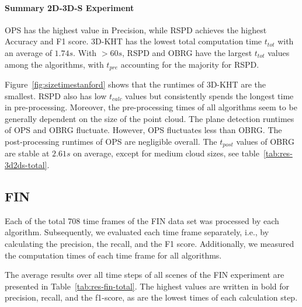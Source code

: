 \documentclass[main.tex]{subfiles}
\begin{document}
\paragraph{Summary 2D-3D-S Experiment}
OPS has the highest value in Precision, while RSPD achieves the highest Accuracy and F1 score.
3D-KHT has the lowest total computation time $t_{tot}$ with an average of $1.74s$. With ${>}60s$,
RSPD and OBRG have the largest $t_{tot}$ values among the algorithms, with $t_{pre}$ accounting for
the majority for RSPD.

Figure~\ref{fig:sizetimestanford} shows that the runtimes of 3D-KHT are the smallest. RSPD also has low $t_{calc}$ values
but consistently spends the longest time in pre-processing.
Moreover, the pre-processing times of all algorithms seem to be generally dependent on the size of the point cloud.
The plane detection runtimes of OPS and OBRG fluctuate. However, OPS fluctuates less than OBRG.
The post-processing runtimes of OPS are negligible overall. The $t_{post}$ values of OBRG are stable at $2.61s$ on average,
except for medium cloud sizes, see table~\ref{tab:res-3d2ds-total}.

\subsection{FIN}
Each of the total 708 time frames of the FIN data set was processed by each algorithm.
Subsequently, we evaluated each time frame separately, i.e., by calculating the precision, the recall, and the F1 score.
Additionally, we measured the computation times of each time frame for all algorithms.

The average results over all time steps of all scenes of the FIN experiment are presented in Table~\ref{tab:res-fin-total}.
The highest values are written in bold for precision, recall, and the f1-score, as are the lowest times of each calculation step.
\end{document}
